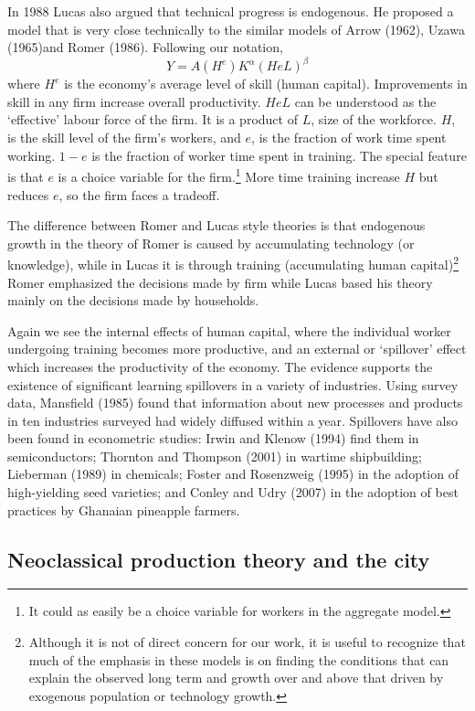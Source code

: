 In 1988 Lucas also argued that technical progress is endogenous. He proposed a model that is very close technically to the similar models of Arrow (1962), Uzawa (1965)and Romer (1986). Following our notation, 
\[ Y = A(H^e) K^\alpha (HeL)^\beta \] 
where $H^e$ is the economy's average level of skill (human capital).  Improvements in skill in any firm  increase overall productivity.  $HeL$  can be understood as the `effective' labour force of the firm. It is a product of $L$, size of the workforce. $H$, is the skill level of the firm's workers, and $e$, is the fraction of work time spent working. $1-e$ is the fraction of worker time  spent in training. The  special feature is that $e$ is a choice variable for the firm.\footnote{It could as easily be a choice variable for workers in the aggregate model.} More time training increase $H$ but reduces $e$, so the firm faces a tradeoff.


The difference between Romer and Lucas style theories is that endogenous growth in the theory of Romer is caused by accumulating technology (or knowledge), while in Lucas it is through training (accumulating human capital)\footnote{Although it is not of direct concern for our work, it is useful to recognize that much of the emphasis in these models is on finding the conditions that can explain the observed long term  and growth over and above that driven by exogenous population or technology growth. } Romer  emphasized the decisions made by firm while Lucas  based his theory mainly on the decisions made by households. 


Again we see the  internal effects of human capital, where the individual worker undergoing training becomes more productive, and an external or `spillover' effect which increases the productivity of the economy. 
The evidence supports the existence of significant learning spillovers in a variety of industries. Using survey data, Mansfield (1985) found that information about new processes and products in ten industries surveyed had widely diffused within a year. Spillovers have also been found in econometric studies: Irwin and Klenow (1994) find them in semiconductors; Thornton and Thompson (2001) in wartime shipbuilding; Lieberman (1989) in chemicals; Foster and Rosenzweig (1995) in the adoption of high-yielding seed varieties; and Conley and Udry (2007) in the adoption of best practices by Ghanaian pineapple farmers. 

\subsection{Neoclassical production theory and the city}

